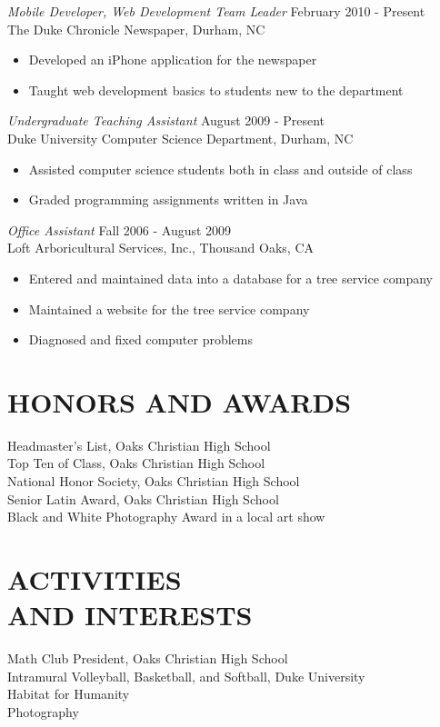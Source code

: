 \documentclass[line,margin]{res}
\begin{document}
\begin{resume}
	{\sl Mobile Developer, Web Development Team Leader} \hfill February 2010 - Present \\
                The Duke Chronicle Newspaper, Durham, NC
                 \begin{itemize}  \itemsep -2pt %
                 \item Developed an iPhone application for the newspaper
				 \item Taught web development basics to students new to the department
                \end{itemize}

				{\sl Undergraduate Teaching Assistant} \hfill August 2009 - Present \\
                Duke University Computer Science Department, 
                Durham, NC
                 \begin{itemize}  \itemsep -2pt %
                 \item Assisted computer science students both in class and outside of class
				 \item Graded programming assignments written in Java
                \end{itemize}
 
                {\sl Office Assistant} \hfill            Fall 2006 - August 2009 \\
                Loft Arboricultural Services, Inc., Thousand Oaks, CA 
                 \begin{itemize}  \itemsep -2pt %
                 \item Entered and maintained data into a database for a tree service company
				 \item Maintained a website for the tree service company
 				 \item Diagnosed and fixed computer problems
                 \end{itemize} 
                

\section{HONORS AND AWARDS}
	Headmaster's List, Oaks Christian High School \\
	Top Ten of Class, Oaks Christian High School \\
	National Honor Society, Oaks Christian High School \\
	Senior Latin Award, Oaks Christian High School \\
	Black and White Photography Award in a local art show

\section{ACTIVITIES \\ AND INTERESTS}             
 			Math Club President, Oaks Christian High School \\
			Intramural Volleyball, Basketball, and Softball, Duke University \\
			Habitat for Humanity \\
			Photography
\end{resume}
\end{document}
